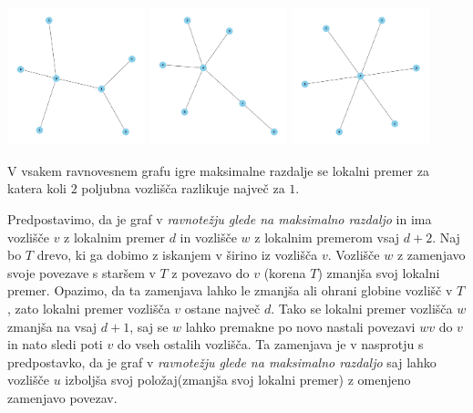 \documentclass[fin1, tisk]{fmfdelo}
\begin{document}
\includegraphics[width=0.3\textwidth]{drevo_1.png}
\includegraphics[width=0.3\textwidth]{drevo_2.png}
\includegraphics[width=0.3\textwidth]{drevo_3.png}


\begin{lema}
V vsakem ravnovesnem grafu igre maksimalne razdalje se lokalni premer za
katera koli $2$ poljubna vozlišča razlikuje največ za $1$.
\end{lema}

\begin{dokaz}
Predpostavimo, da je graf v \textit{ravnotežju glede na maksimalno razdaljo} in ima vozlišče $v$ z lokalnim premer $d$ in vozlišče
$w$ z lokalnim premerom vsaj $d+2$. Naj bo $T$ drevo, ki ga dobimo z iskanjem v širino
iz vozlišča $v$. Vozlišče $w$ z zamenjavo svoje povezave s staršem v $T$ z povezavo do
$v$ (korena $T$) zmanjša svoj lokalni premer. Opazimo, da ta zamenjava lahko le zmanjša ali ohrani globine vozlišč v $T$,
zato lokalni premer vozlišča $v$ ostane največ $d$. Tako se lokalni premer
vozlišča $w$ zmanjša na vsaj $d+1$, saj se $w$ lahko premakne po novo nastali povezavi $wv$ do
$v$ in nato sledi poti $v$ do vseh ostalih vozlišča. Ta zamenjava
je v nasprotju s predpostavko, da je graf v \textit{ravnotežju glede na maksimalno razdaljo} saj lahko vozlišče $u$
izboljša svoj položaj(zmanjša svoj lokalni premer) z omenjeno zamenjavo povezav.
\end{dokaz}
\end{document}

